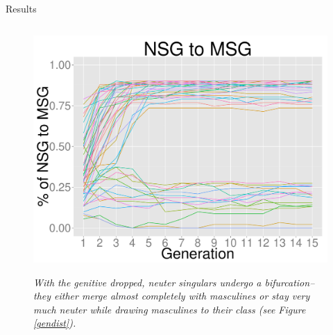 \documentclass[final]{beamer}
\newlength{\twocolwid}
\begin{document}
\begin{frame}[t]
\begin{columns}[t]
\begin{column}{\twocolwid}
\begin{block}{Results}
\begin{columns}[t]
\begin{column}{.33\linewidth}
\begin{figure}
\begin{center} 
\vspace{2cm}
{\centering \includegraphics[width=1\textwidth]{nsgtomsg.pdf}}
\end{center}
\footnotesize
\caption{\textit{With the genitive dropped, neuter singulars undergo a bifurcation--they either merge almost completely with masculines or stay very much neuter while drawing masculines to their class (see Figure \ref{gendist}).}}
\end{figure}     
            

\end{column}
\end{columns}
\end{block}
\end{column}
\end{columns}
\end{frame}
\end{document}
